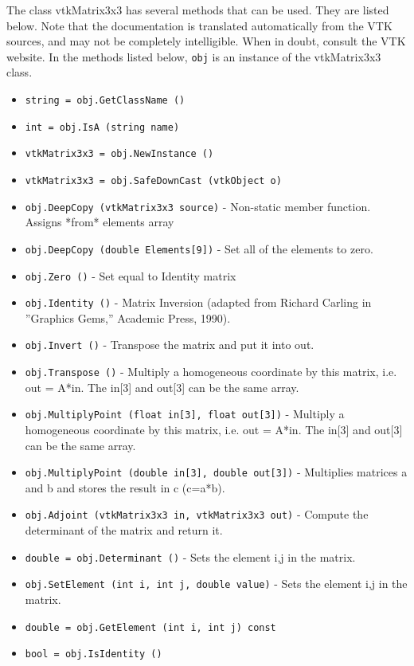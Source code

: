 The class vtkMatrix3x3 has several methods that can be used.
  They are listed below.
Note that the documentation is translated automatically from the VTK sources,
and may not be completely intelligible.  When in doubt, consult the VTK website.
In the methods listed below, \verb|obj| is an instance of the vtkMatrix3x3 class.
\begin{itemize}
\item  \verb|string = obj.GetClassName ()|

\item  \verb|int = obj.IsA (string name)|

\item  \verb|vtkMatrix3x3 = obj.NewInstance ()|

\item  \verb|vtkMatrix3x3 = obj.SafeDownCast (vtkObject o)|

\item  \verb|obj.DeepCopy (vtkMatrix3x3 source)| -  Non-static member function. Assigns *from* elements array

\item  \verb|obj.DeepCopy (double Elements[9])| -  Set all of the elements to zero.

\item  \verb|obj.Zero ()| -  Set equal to Identity matrix

\item  \verb|obj.Identity ()| -  Matrix Inversion (adapted from Richard Carling in ''Graphics Gems,''
 Academic Press, 1990).

\item  \verb|obj.Invert ()| -  Transpose the matrix and put it into out.

\item  \verb|obj.Transpose ()| -  Multiply a homogeneous coordinate by this matrix, i.e. out = A*in.
 The in[3] and out[3] can be the same array.

\item  \verb|obj.MultiplyPoint (float in[3], float out[3])| -  Multiply a homogeneous coordinate by this matrix, i.e. out = A*in.
 The in[3] and out[3] can be the same array.

\item  \verb|obj.MultiplyPoint (double in[3], double out[3])| -  Multiplies matrices a and b and stores the result in c (c=a*b).

\item  \verb|obj.Adjoint (vtkMatrix3x3 in, vtkMatrix3x3 out)| -  Compute the determinant of the matrix and return it.

\item  \verb|double = obj.Determinant ()| -  Sets the element i,j in the matrix.

\item  \verb|obj.SetElement (int i, int j, double value)| -  Sets the element i,j in the matrix.

\item  \verb|double = obj.GetElement (int i, int j) const|

\item  \verb|bool = obj.IsIdentity ()|

\end{itemize}
